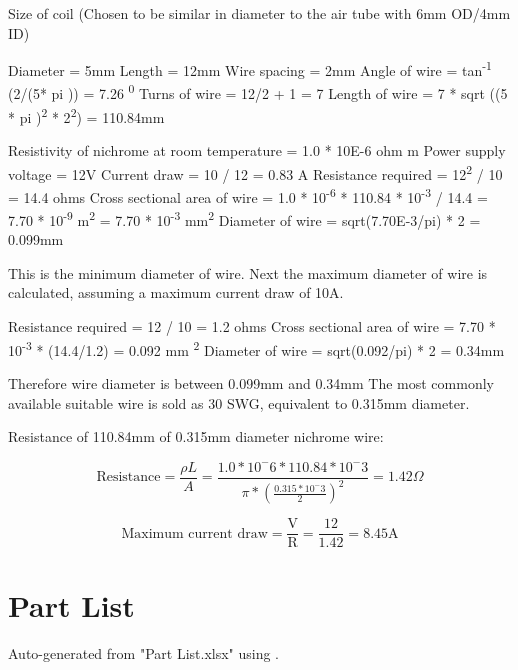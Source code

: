 Size of coil (Chosen to be similar in diameter to the air tube with 6mm OD/4mm ID)

Diameter = 5mm
Length = 12mm
Wire spacing = 2mm
Angle of wire = tan\textsuperscript{-1} (2/(5* pi )) = 7.26 \textsuperscript{0}
Turns of wire = 12/2 + 1 = 7
Length of wire = 7 * sqrt ((5 * pi )\textsuperscript{2}  * 2\textsuperscript{2}) =  110.84mm

Resistivity of nichrome at room temperature = 1.0 * 10E-6 ohm m 
Power supply voltage = 12V
Current draw = 10 / 12 = 0.83 A 
Resistance required = 12\textsuperscript{2} / 10 = 14.4 ohms
Cross sectional area of wire = 1.0 * 10\textsuperscript{-6} * 110.84 * 10\textsuperscript{-3} / 14.4 = 7.70 * 10\textsuperscript{-9} m\textsuperscript{2} = 7.70 * 10\textsuperscript{-3} mm\textsuperscript{2}
Diameter of wire = sqrt(7.70E-3/pi) * 2 = 0.099mm

This is the minimum diameter of wire. Next the maximum diameter of wire is calculated, assuming a maximum current draw of 10A.

Resistance required = 12 / 10 = 1.2 ohms
Cross sectional area of wire = 7.70 * 10\textsuperscript{-3} * (14.4/1.2) = 0.092 mm \textsuperscript{2}
Diameter of wire = sqrt(0.092/pi) * 2 = 0.34mm

Therefore wire diameter is between 0.099mm and 0.34mm
The most commonly available suitable wire is sold as 30 SWG, equivalent to 0.315mm diameter.

Resistance of 110.84mm of 0.315mm diameter nichrome wire:

\begin{displaymath}
\text{Resistance} = \frac{\rho L}{A}
= \frac{1.0*10^-6*110.84*10^-3}{\pi*(\frac{0.315*10^-3}{2})^2}
= 1.42 \Omega
\end{displaymath}



\begin{displaymath}
\text{Maximum current draw} = \frac{\text{V}}{\text{R}}
= \frac{12}{1.42}
= 8.45 \text{A}
\end{displaymath}

\newpage
\section{Part List}

Auto-generated from "Part List.xlsx" using \cite{excel2latex}.

